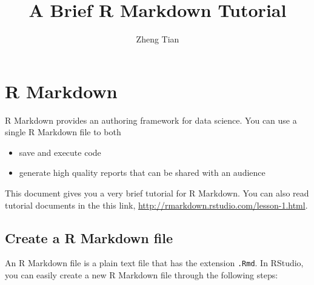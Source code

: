 \documentclass[11pt]{article}
\author{Zheng Tian}
\date{}
\title{A Brief R Markdown Tutorial}
\begin{document}
\maketitle


\section{R Markdown}
\label{sec:org42d6906}

R Markdown provides an authoring framework for data science. You can use
a single R Markdown file to both
\begin{itemize}
\item save and execute code
\item generate high quality reports that can be shared with an audience
\end{itemize}

This document gives you a very brief tutorial for R Markdown. You can
also read tutorial documents in the this link,
\url{http://rmarkdown.rstudio.com/lesson-1.html}.

\subsection*{Create a R Markdown file}
\label{sec:orgf6d5547}

An R Markdown file is a plain text file that has the extension \texttt{.Rmd}.
In RStudio, you can easily create a new R Markdown file through the
following steps:

\end{document}
